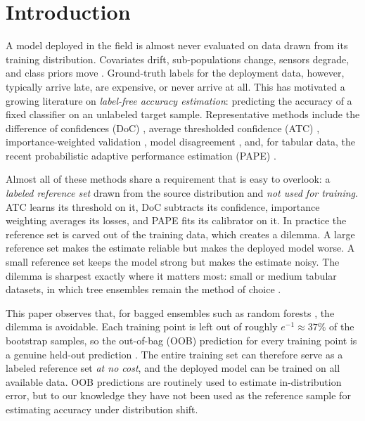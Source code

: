 \section{Introduction}
\label{sec:intro}

A model deployed in the field is almost never evaluated on data drawn from its training distribution. Covariates drift, sub-populations change, sensors degrade, and class priors move \citep{rabanser2019failing}. Ground-truth labels for the deployment data, however, typically arrive late, are expensive, or never arrive at all. This has motivated a growing literature on \emph{label-free accuracy estimation}: predicting the accuracy of a fixed classifier on an unlabeled target sample. Representative methods include the difference of confidences (DoC) \citep{guillory2021doc}, average thresholded confidence (ATC) \citep{garg2022atc}, importance-weighted validation \citep{sugiyama2007iwcv}, model disagreement \citep{jiang2022gde,baek2022aotl}, and, for tabular data, the recent probabilistic adaptive performance estimation (PAPE) \citep{bialek2025pape}.

Almost all of these methods share a requirement that is easy to overlook: a \emph{labeled reference set} drawn from the source distribution and \emph{not used for training}. ATC learns its threshold on it, DoC subtracts its confidence, importance weighting averages its losses, and PAPE fits its calibrator on it. In practice the reference set is carved out of the training data, which creates a dilemma. A large reference set makes the estimate reliable but makes the deployed model worse. A small reference set keeps the model strong but makes the estimate noisy. The dilemma is sharpest exactly where it matters most: small or medium tabular datasets, in which tree ensembles remain the method of choice \citep{grinsztajn2022tabular}.

This paper observes that, for bagged ensembles such as random forests \citep{breiman2001rf}, the dilemma is avoidable. Each training point is left out of roughly $e^{-1}\approx 37\%$ of the bootstrap samples, so the out-of-bag (OOB) prediction for every training point is a genuine held-out prediction \citep{breiman1996oob}. The entire training set can therefore serve as a labeled reference set \emph{at no cost}, and the deployed model can be trained on all available data. OOB predictions are routinely used to estimate in-distribution error, but to our knowledge they have not been used as the reference sample for estimating accuracy under distribution shift.

